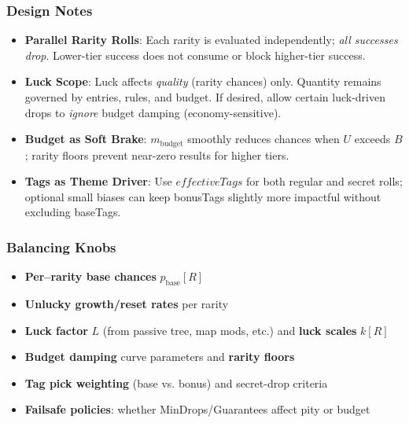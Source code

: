 \subsubsection*{Design Notes}
\begin{itemize}
	\item \textbf{Parallel Rarity Rolls}: Each rarity is evaluated independently; \emph{all successes drop}. Lower-tier success does not consume or block higher-tier success.
	\item \textbf{Luck Scope}: Luck affects \emph{quality} (rarity chances) only. Quantity remains governed by entries, rules, and budget. If desired, allow certain luck-driven drops to \emph{ignore} budget damping (economy-sensitive).
	\item \textbf{Budget as Soft Brake}: $m_{\text{budget}}$ smoothly reduces chances when $U$ exceeds $B$; rarity floors prevent near-zero results for higher tiers.
	\item \textbf{Tags as Theme Driver}: Use $effectiveTags$ for both regular and secret rolls; optional small biases can keep bonusTags slightly more impactful without excluding baseTags.
\end{itemize}

\subsubsection*{Balancing Knobs}
\begin{itemize}
	\item \textbf{Per–rarity base chances} $p_{\text{base}}[R]$
	\item \textbf{Unlucky growth/reset rates} per rarity
	\item \textbf{Luck factor} $L$ (from passive tree, map mods, etc.) and \textbf{luck scales} $k[R]$
	\item \textbf{Budget damping} curve parameters and \textbf{rarity floors}
	\item \textbf{Tag pick weighting} (base vs. bonus) and secret-drop criteria
	\item \textbf{Failsafe policies}: whether MinDrops/Guarantees affect pity or budget
\end{itemize}
